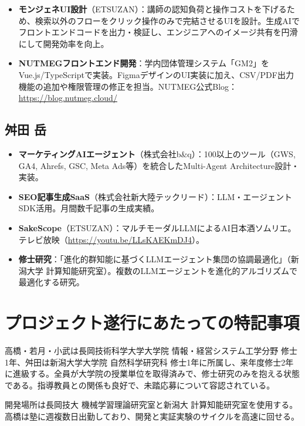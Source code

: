 \documentclass[paper=a4,fontsize=10.5bp,jafontsize=10.5bp,twocolumn]{jlreq}
\begin{document}
\begin{itemize}
  \item \textbf{モンジェネUI設計}（ETSUZAN）：講師の認知負荷と操作コストを下げるため、検索以外のフローをクリック操作のみで完結させるUIを設計。生成AIでフロントエンドコードを出力・検証し、エンジニアへのイメージ共有を円滑にして開発効率を向上。
  \item \textbf{NUTMEGフロントエンド開発}：学内団体管理システム「GM2」をVue.js/TypeScriptで実装。FigmaデザインのUI実装に加え、CSV/PDF出力機能の追加や権限管理の修正を担当。NUTMEG公式Blog：\url{https://blog.nutmeg.cloud/}
\end{itemize}

\subsection*{舛田 岳}

\begin{itemize}
  \item \textbf{マーケティングAIエージェント}（株式会社b\&q）：100以上のツール（GWS, GA4, Ahrefs, GSC, Meta Ads等）を統合したMulti-Agent Architecture設計・実装。
  \item \textbf{SEO記事生成SaaS}（株式会社新大陸テックリード）：LLM・エージェントSDK活用。月間数千記事の生成実績。
  \item \textbf{SakeScope}（ETSUZAN）：マルチモーダルLLMによるAI日本酒ソムリエ。テレビ放映（\url{https://youtu.be/LLsKAEKmDJ4}）。
  \item \textbf{修士研究}：「進化的群知能に基づくLLMエージェント集団の協調最適化」（新潟大学 計算知能研究室）。複数のLLMエージェントを進化的アルゴリズムで最適化する研究。
\end{itemize}

\section{プロジェクト遂行にあたっての特記事項}

高橋・若月・小武は長岡技術科学大学大学院 情報・経営システム工学分野 修士1年、舛田は新潟大学大学院 自然科学研究科 修士1年に所属し、来年度修士2年に進級する。全員が大学院の授業単位を取得済みで、修士研究のみを抱える状態である。指導教員との関係も良好で、未踏応募について容認されている。

開発場所は長岡技大 機械学習理論研究室と新潟大 計算知能研究室を使用する。高橋は塾に週複数日出勤しており、開発と実証実験のサイクルを高速に回せる。
\end{document}
